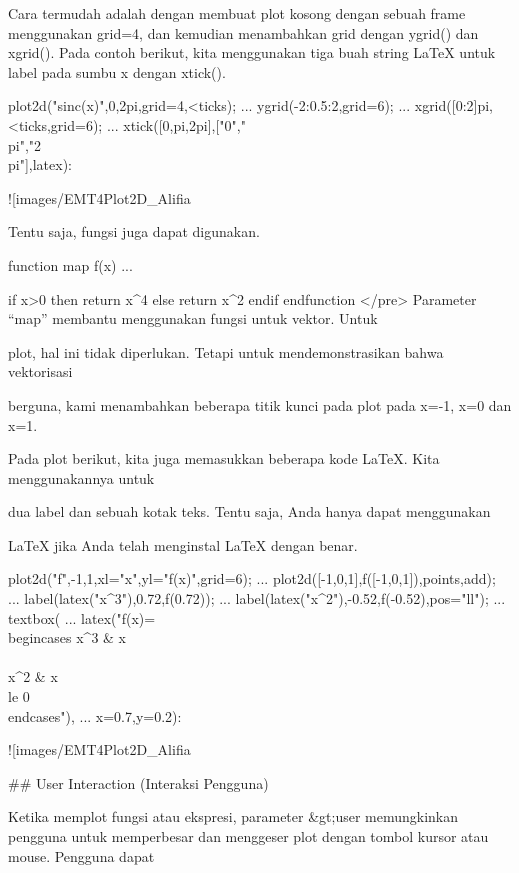 \documentclass{article}
\begin{document}
Cara termudah adalah dengan membuat plot kosong dengan sebuah frame
menggunakan grid=4, dan kemudian menambahkan grid dengan ygrid() dan
xgrid(). Pada contoh berikut, kita menggunakan tiga buah string LaTeX
untuk label pada sumbu x dengan xtick().


\>plot2d("sinc(x)",0,2pi,grid=4,<ticks); ...  
\>   ygrid(-2:0.5:2,grid=6); ...  
\>   xgrid([0:2]\*pi,<ticks,grid=6);  ...  
\>   xtick([0,pi,2pi],["0","\\pi","2\\pi"],\>latex):


![images/EMT4Plot2D_Alifia%

Tentu saja, fungsi juga dapat digunakan.


\>function map f(x) ...


    if x>0 then return x^4
    else return x^2
    endif
    endfunction
</pre>
Parameter “map” membantu menggunakan fungsi untuk vektor. Untuk


plot, hal ini tidak diperlukan. Tetapi untuk mendemonstrasikan bahwa
vektorisasi


berguna, kami menambahkan beberapa titik kunci pada plot pada x=-1,
x=0 dan x=1.


Pada plot berikut, kita juga memasukkan beberapa kode LaTeX. Kita
menggunakannya untuk


dua label dan sebuah kotak teks. Tentu saja, Anda hanya dapat
menggunakan


LaTeX jika Anda telah menginstal LaTeX dengan benar.


\>plot2d("f",-1,1,xl="x",yl="f(x)",grid=6);  ...  
\>   plot2d([-1,0,1],f([-1,0,1]),\>points,\>add); ...  
\>   label(latex("x^3"),0.72,f(0.72)); ...  
\>   label(latex("x^2"),-0.52,f(-0.52),pos="ll"); ...  
\>   textbox( ...  
\>     latex("f(x)=\\begin{cases} x^3 & x \\\\ x^2 & x \\le 0\\end{cases}"), ...  
\>     x=0.7,y=0.2):


![images/EMT4Plot2D_Alifia%

## User Interaction (Interaksi Pengguna)

Ketika memplot fungsi atau ekspresi, parameter &gt;user memungkinkan
pengguna untuk memperbesar dan menggeser plot dengan tombol kursor
atau mouse. Pengguna dapat
\end{document}
